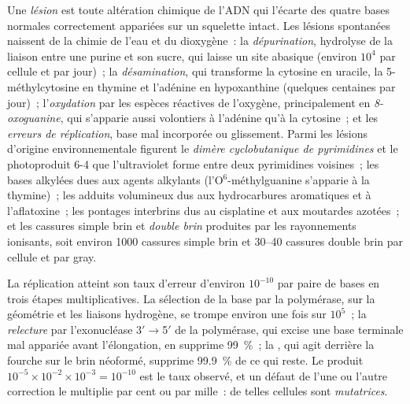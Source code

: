 \begin{definition}\label{def:b3:dna-repair:lesions}
Une \emph{lésion} est toute altération chimique de l'ADN qui l'écarte
des quatre bases normales correctement appariées sur un squelette
intact. Les lésions spontanées naissent de la chimie de l'eau et du
dioxygène~: la \emph{dépurination}, hydrolyse de la liaison entre une
purine et son sucre, qui laisse un site abasique (environ $10^{4}$ par
cellule et par jour)~; la \emph{désamination}, qui transforme la
cytosine en uracile, la 5-méthylcytosine en thymine et l'adénine en
hypoxanthine (quelques centaines par jour)~; l'\emph{oxydation} par les
espèces réactives de l'oxygène, principalement en \emph{8-oxoguanine},
qui s'apparie aussi volontiers à l'adénine qu'à la cytosine~; et les
\emph{erreurs de réplication}, base mal incorporée ou glissement. Parmi
les lésions d'origine environnementale figurent le \emph{dimère
cyclobutanique de pyrimidines} et le photoproduit 6-4 que l'ultraviolet
forme entre deux pyrimidines voisines~; les bases alkylées dues aux
agents alkylants (l'O$^{6}$-méthylguanine s'apparie à la thymine)~; les
adduits volumineux dus aux hydrocarbures aromatiques et à
l'aflatoxine~; les pontages interbrins dus au cisplatine et aux
moutardes azotées~; et les cassures simple brin et \emph{double brin}
produites par les rayonnements ionisants, soit environ \num{1000}
cassures simple brin et \numrange{30}{40} cassures double brin par
cellule et par gray.
\end{definition}

\begin{proposition}\label{prop:b3:dna-repair:fidelity}
La réplication atteint son taux d'erreur d'environ $10^{-10}$ par paire
de bases en trois étapes multiplicatives. La sélection de la base par
la polymérase, sur la géométrie et les liaisons hydrogène, se trompe
environ une fois sur $10^{5}$~; la \emph{relecture} par l'exonucléase
3$'\to$5$'$ de la polymérase, qui excise une base terminale mal
appariée avant l'élongation, en supprime \qty{99}{\%}~; la
\emph{}, qui agit derrière la fourche sur
le brin néoformé, supprime \qty{99.9}{\%} de ce qui reste. Le produit
$10^{-5}\times 10^{-2}\times 10^{-3} = 10^{-10}$ est le taux observé,
et un défaut de l'une ou l'autre correction le multiplie par cent ou
par mille~: de telles cellules sont \emph{mutatrices}.
\end{proposition}

